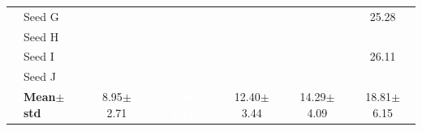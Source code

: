 \begin{table}[H]
{\begin{tabular}{@{}llccccc@{}}
  & Seed G & \cellcolor{RoyalBlue!10}{\small 8.63} & \cellcolor{RoyalBlue!10}{\small 7.86} & \cellcolor{RoyalBlue!10}{\small 9.81} & \cellcolor{RoyalBlue!10}{\small 9.80} & {\small\color{gray!60!black}25.28} \\
  & Seed H & \cellcolor{RoyalBlue!10}{\small 7.23} & \cellcolor{RoyalBlue!10}{\small 7.55} & \cellcolor{RoyalBlue!10}{\small 10.67} & \cellcolor{RoyalBlue!10}{\small 10.75} & \cellcolor{RoyalBlue!10}{\small 12.74} \\
  & Seed I & \cellcolor{RoyalBlue!10}{\small 6.54} & \cellcolor{RoyalBlue!10}{\small 8.11} & \cellcolor{RoyalBlue!10}{\small 9.19} & \cellcolor{RoyalBlue!10}{\small 11.29} & {\small\color{gray!60!black}26.11} \\
  & Seed J & \cellcolor{RoyalBlue!10}{\small 8.27} & \cellcolor{RoyalBlue!10}{\small 7.77} & \cellcolor{RoyalBlue!10}{\small 9.53} & \cellcolor{RoyalBlue!10}{\small 12.34} & \cellcolor{RoyalBlue!10}{\small 11.25} \\
 & \textbf{Mean$\pm$std} & \cellcolor{RoyalBlue!20}8.95$\pm$2.71 & \cellcolor{RoyalBlue!65}\textcolor{white}{\textbf{10.96$\pm$4.11}} & \cellcolor{RoyalBlue!20}12.40$\pm$3.44 & \cellcolor{RoyalBlue!20}14.29$\pm$4.09 & \cellcolor{red!12}18.81$\pm$6.15 \\
\bottomrule
\end{tabular}
}
\end{table}

